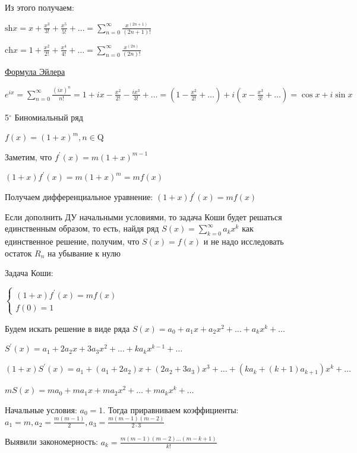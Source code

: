 \documentclass[12pt]{article}
\begin{document}
    Из этого получаем:

    $\mathrm{sh} x = x + \frac{x^3}{3!} + \frac{x^5}{5!} + \dots = \sum_{n = 0}^\infty \frac{x^{(2n + 1)}}{(2n + 1)!}$

    $\mathrm{ch} x = 1 + \frac{x^2}{2!} + \frac{x^4}{4!} + \dots = \sum_{n = 0}^\infty \frac{x^{(2n)}}{(2n)!}$

    \underline{Формула Эйлера}

    $e^{ix} = \sum_{n = 0}^\infty \frac{(ix)^n}{n!} = 1 + ix - \frac{x^2}{2!} - \frac{ix^3}{3!} + \dots = (1 - \frac{x^2}{2!} + \dots) + i(x - \frac{x^3}{3!} + \dots) = \cos x + i\sin x$


    \mediumvspace

    5$^\circ$ Биномиальный ряд

    $f(x) = (1 + x)^m, n \in \mathrm{Q}$

    Заметим, что $f^\prime(x) = m(1 + x)^{m - 1}$

    $(1 + x)f^\prime(x) = m (1 + x)^m = m f(x)$

    Получаем дифференциальное уравнение: $(1 + x)f^\prime(x) = mf(x)$

    \Notas Если дополнить ДУ начальными условиями, то задача Коши будет решаться единственным образом, 
    то есть, найдя ряд $S(x) = \sum_{k = 0}^{\infty} a_k x^k$ как единственное решение,
    получим, что $S(x) = f(x)$ и не надо исследовать остаток $R_n$ на убывание к нулю

    Задача Коши:

    $\begin{cases}
        (1 + x) f^\prime(x) = m f(x) \\
        f(0) = 1
    \end{cases}$

    Будем искать решение в виде ряда $S(x) = a_0 + a_1 x + a_2 x^2 + \dots + a_k x^k + \dots$

    $S^\prime(x) = a_1 + 2a_2 x + 3a_3 x^2 + \dots + k a_k x^{k - 1} + \dots$

    $(1 + x) S^\prime(x) = a_1 + (a_1 + 2a_2)x + (2a_2 + 3a_3) x^3 + \dots + (k a_k + (k + 1) a_{k + 1})x^k + \dots$

    $mS(x) = ma_0 + ma_1 x + ma_2 x^2 + \dots + m a_k x^k + \dots$

    Начальные условия: $a_0 = 1$. Тогда приравниваем коэффициенты: $a_1 = m, a_2 = \frac{m(m - 1)}{2}, a_3 = \frac{m(m - 1)(m - 2)}{2 \cdot 3}$

    Выявили закономерность: $a_k = \frac{m(m - 1)(m - 2)\dots(m - k + 1)}{k!}$
\end{document}
